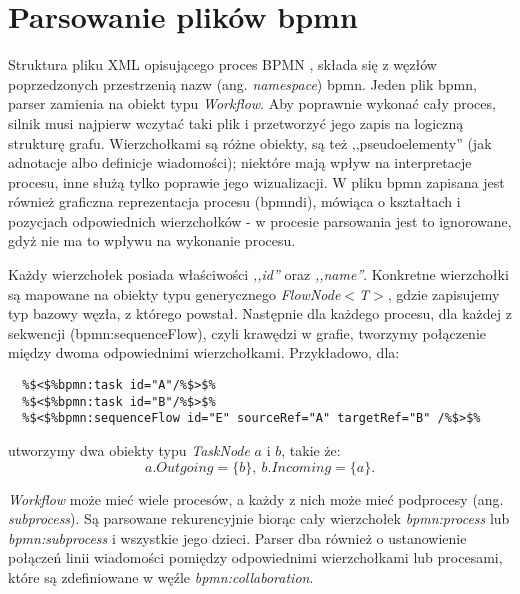 \documentclass[declaration,shortabstract,mgr]{iithesis}
\newcommand{\bpmn}{BPMN }
\begin{document}
\section{Parsowanie plików bpmn}
Struktura pliku XML opisującego proces \bpmn, składa się z węzłów poprzedzonych przestrzenią nazw (ang. \textit{namespace}) bpmn. Jeden plik bpmn, parser zamienia na obiekt typu \textit{Workflow}.  Aby poprawnie wykonać cały proces, silnik musi najpierw wczytać taki plik i przetworzyć jego zapis na logiczną strukturę grafu. Wierzchołkami są różne obiekty, są też ,,pseudoelementy'' (jak adnotacje albo definicje wiadomości); niektóre mają wpływ na interpretacje procesu, inne służą tylko poprawie jego wizualizacji. W pliku bpmn zapisana jest również graficzna reprezentacja procesu (bpmndi), mówiąca o kształtach i pozycjach odpowiednich wierzchołków - w procesie parsowania jest to ignorowane, gdyż nie ma to wpływu na wykonanie procesu.

Każdy wierzchołek posiada właściwości \textit{,,id''} oraz \textit{,,name''}. Konkretne wierzchołki są mapowane na obiekty typu generycznego \emph{FlowNode$<$T$>$}, gdzie zapisujemy typ bazowy węzła, z którego powstał. Następnie dla każdego procesu, dla każdej z sekwencji (bpmn:sequenceFlow), czyli krawędzi w grafie, tworzymy połączenie między dwoma odpowiednimi wierzchołkami. Przykładowo, dla:

\begin{minipage}[c]{\textwidth}
\centering
\begin{lstlisting}
  %$<$%bpmn:task id="A"/%$>$%
  %$<$%bpmn:task id="B"/%$>$%
  %$<$%bpmn:sequenceFlow id="E" sourceRef="A" targetRef="B" /%$>$%
\end{lstlisting}
\end{minipage}

\noindent utworzymy dwa obiekty typu \textit{TaskNode} $a$ i $b$, takie że: $$a.Outgoing = \{b\},\ b.Incoming = \{a\}.$$

\textit{Workflow} może mieć wiele procesów, a każdy z nich może mieć podprocesy (ang. \textit{subprocess}). Są parsowane rekurencyjnie biorąc cały wierzchołek \textit{bpmn:process} lub \textit{bpmn:subprocess} i wszystkie jego dzieci. Parser dba również o ustanowienie połączeń linii wiadomości pomiędzy odpowiednimi wierzchołkami lub procesami, które są zdefiniowane w węźle \textit{bpmn:collaboration}.
\newpage
\end{document}
